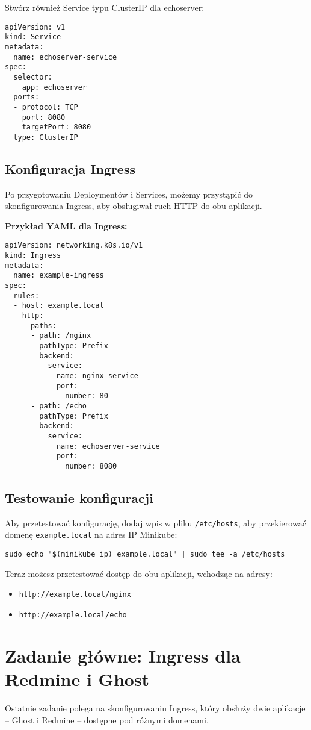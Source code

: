 \documentclass{article}
\begin{document}
Stwórz również Service typu ClusterIP dla echoserver:
\begin{lstlisting}
apiVersion: v1
kind: Service
metadata:
  name: echoserver-service
spec:
  selector:
    app: echoserver
  ports:
  - protocol: TCP
    port: 8080
    targetPort: 8080
  type: ClusterIP
\end{lstlisting}

\subsection{Konfiguracja Ingress}
Po przygotowaniu Deploymentów i Services, możemy przystąpić do skonfigurowania Ingress, aby obsługiwał ruch HTTP do obu aplikacji.

\textbf{Przykład YAML dla Ingress:}
\begin{lstlisting}[]
apiVersion: networking.k8s.io/v1
kind: Ingress
metadata:
  name: example-ingress
spec:
  rules:
  - host: example.local
    http:
      paths:
      - path: /nginx
        pathType: Prefix
        backend:
          service:
            name: nginx-service
            port:
              number: 80
      - path: /echo
        pathType: Prefix
        backend:
          service:
            name: echoserver-service
            port:
              number: 8080
\end{lstlisting}

\subsection{Testowanie konfiguracji}
Aby przetestować konfigurację, dodaj wpis w pliku \texttt{/etc/hosts}, aby przekierować domenę \texttt{example.local} na adres IP Minikube:
\begin{verbatim}
sudo echo "$(minikube ip) example.local" | sudo tee -a /etc/hosts
\end{verbatim}

Teraz możesz przetestować dostęp do obu aplikacji, wchodząc na adresy:
\begin{itemize}
    \item \texttt{http://example.local/nginx}
    \item \texttt{http://example.local/echo}
\end{itemize}

\section{Zadanie główne: Ingress dla Redmine i Ghost}
Ostatnie zadanie polega na skonfigurowaniu Ingress, który obsłuży dwie aplikacje – Ghost i Redmine – dostępne pod różnymi domenami.
\end{document}
